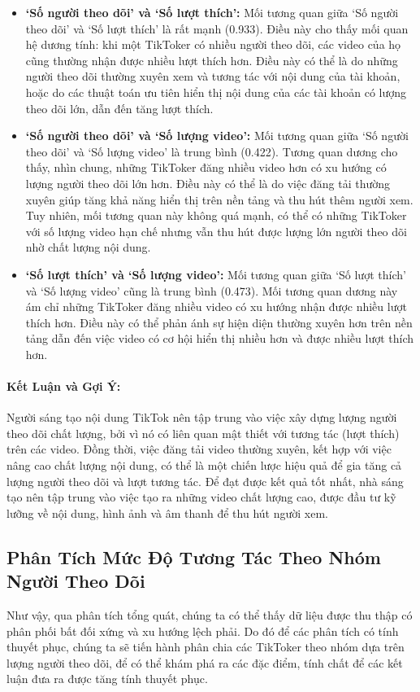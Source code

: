 \begin{itemize}
    \item \textbf{`Số người theo dõi' và `Số lượt thích':} Mối tương quan giữa `Số người theo dõi' và `Số lượt thích' là rất mạnh (0.933). Điều này cho thấy mối quan hệ dương tính: khi một TikToker có nhiều người theo dõi, các video của họ cũng thường nhận được nhiều lượt thích hơn. Điều này có thể là do những người theo dõi thường xuyên xem và tương tác với nội dung của tài khoản, hoặc do các thuật toán ưu tiên hiển thị nội dung của các tài khoản có lượng theo dõi lớn, dẫn đến tăng lượt thích.
    
    \item \textbf{`Số người theo dõi' và `Số lượng video':} Mối tương quan giữa `Số người theo dõi' và `Số lượng video' là trung bình (0.422). Tương quan dương cho thấy, nhìn chung, những TikToker đăng nhiều video hơn có xu hướng có lượng người theo dõi lớn hơn. Điều này có thể là do việc đăng tải thường xuyên giúp tăng khả năng hiển thị trên nền tảng và thu hút thêm người xem. Tuy nhiên, mối tương quan này không quá mạnh, có thể có những TikToker với số lượng video hạn chế nhưng vẫn thu hút được lượng lớn người theo dõi nhờ chất lượng nội dung.
    
    \item \textbf{`Số lượt thích' và `Số lượng video':} Mối tương quan giữa `Số lượt thích' và `Số lượng video' cũng là trung bình (0.473). Mối tương quan dương này ám chỉ những TikToker đăng nhiều video có xu hướng nhận được nhiều lượt thích hơn. Điều này có thể phản ánh sự hiện diện thường xuyên hơn trên nền tảng dẫn đến việc video có cơ hội hiển thị nhiều hơn và được nhiều lượt thích hơn.
\end{itemize}

\paragraph{Kết Luận và Gợi Ý:}
Người sáng tạo nội dung TikTok nên tập trung vào việc xây dựng lượng người theo dõi chất lượng, bởi vì nó có liên quan mật thiết với tương tác (lượt thích) trên các video. Đồng thời, việc đăng tải video thường xuyên, kết hợp với việc nâng cao chất lượng nội dung, có thể là một chiến lược hiệu quả để gia tăng cả lượng người theo dõi và lượt tương tác. Để đạt được kết quả tốt nhất, nhà sáng tạo nên tập trung vào việc tạo ra những video chất lượng cao, được đầu tư kỹ lưỡng về nội dung, hình ảnh và âm thanh để thu hút người xem.

\subsection{Phân Tích Mức Độ Tương Tác Theo Nhóm Người Theo Dõi}
Như vậy, qua phân tích tổng quát, chúng ta có thể thấy dữ liệu được thu thập có phân phối bất đối xứng và xu hướng lệch phải. Do đó để các phân tích có tính thuyết phục, chúng ta sẽ tiến hành phân chia các TikToker theo nhóm dựa trên lượng người theo dõi, để có thể khám phá ra các đặc điểm, tính chất để các kết luận đưa ra được tăng tính thuyết phục.

